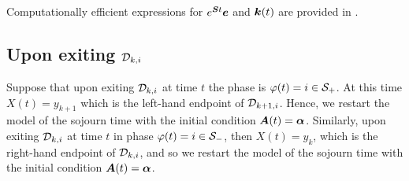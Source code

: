 Computationally efficient expressions for \(e^{\boldsymbol{S}t}\boldsymbol e\) and \(\boldsymbol k(t)\) are provided in \citep{hht2020}. 

\subsection{Upon exiting \(\mathcal{D}_{k,i}\)} Suppose that upon exiting \(\mathcal{D}_{k,i}\) at time \(t\) the phase is \(\varphi(t)=i\in\mathcal{S}_+\). At this time \(X(t)=y_{k+1}\) which is the left-hand endpoint of \(\mathcal{D}_{k+1,i}\). Hence, we restart the model of the sojourn time with the initial condition \(\boldsymbol A(t)=\boldsymbol \alpha\). Similarly, upon exiting \(\mathcal{D}_{k,i}\) at time \(t\) in phase \(\varphi(t)=i\in\mathcal{S}_-\), then \(X(t)=y_k\), which is the right-hand endpoint of \(\mathcal{D}_{k,i}\), and so we restart the model of the sojourn time with the initial condition \(\boldsymbol A(t)=\boldsymbol \alpha\).

